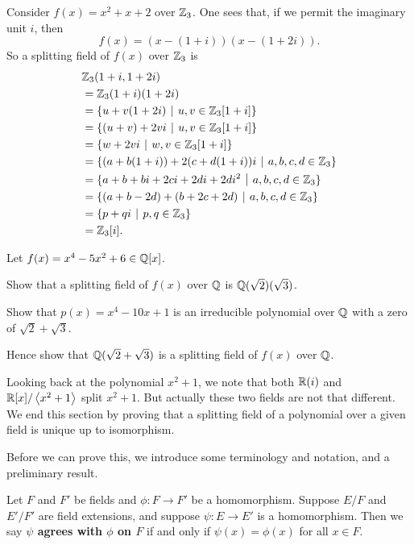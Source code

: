 \begin{example}
    Consider $f(x) = x^2 + x + 2$ over $\mathbb{Z}_3$. One sees that, if we permit the imaginary unit $i$, then
    \[
        f(x) = (x-(1+i))(x-(1+2i)).
    \]
    So a splitting field of $f(x)$ over $\mathbb{Z}_3$ is
    \begin{align*}
        &\Z_3(1+i, 1+2i)\\
        &= \Z_3(1+i)(1+2i)\\
        &=\{u + v(1+2i) \vert u, v \in \Z_3[1+i]\}\\
        &=\{(u+v) + 2vi \vert u, v \in \Z_3[1+i]\}\\
        &=\{w + 2vi \vert w, v \in \Z_3[1+i]\}\\
        &=\{(a+b(1+i)) + 2(c+d(1+i))i \vert a,b,c,d\in\Z_3\}\\
        &=\{a+b+bi + 2ci + 2di + 2di^2 \vert a,b,c,d\in\Z_3\}\\
        &=\{(a+b-2d) + (b+2c+2d) \vert a,b,c,d\in\Z_3\}\\
        &=\{p + qi \vert p,q\in\Z_3\}\\
        &=\Z_3[i].
    \end{align*}
\end{example}

\begin{exercise}\label{exercise-splitting-field-sqrt2-sqrt3}
    Let $f(x) = x^4 - 5x^2 + 6 \in \mathbb{Q}[x]$.
    \begin{partquestions}{\roman*}
        \item Show that a splitting field of $f(x)$ over $\mathbb{Q}$ is $\mathbb{Q}(\sqrt2)(\sqrt3)$.
        \item Show that $p(x) = x^4 - 10x + 1$ is an irreducible polynomial over $\mathbb{Q}$ with a zero of $\sqrt2 + \sqrt3$.
        \item Hence show that $\mathbb{Q}(\sqrt2 + \sqrt3)$ is a splitting field of $f(x)$ over $\mathbb{Q}$.
    \end{partquestions}
\end{exercise}

Looking back at the polynomial $x^2+1$, we note that both $\mathbb{R}(i)$ and $\mathbb{R}[x]/\left\langle x^2+1\right\rangle$ split $x^2+1$. But actually these two fields are not that different. We end this section by proving that a splitting field of a polynomial over a given field is unique up to isomorphism.

Before we can prove this, we introduce some terminology and notation, and a preliminary result.

\begin{definition}
    Let $F$ and $F'$ be fields and $\phi: F \to F'$ be a homomorphism. Suppose $E/F$ and $E'/F'$ are field extensions, and suppose $\psi: E \to E'$ is a homomorphism. Then we say \textbf{$\psi$ agrees with $\phi$ on $F$} if and only if $\psi(x) = \phi(x)$ for all $x \in F$.
\end{definition}

